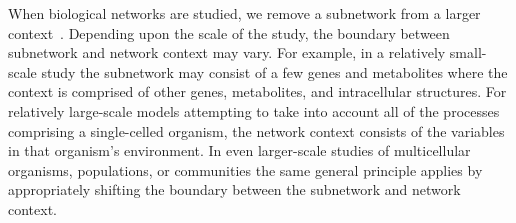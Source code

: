 
When biological networks are studied, we remove a subnetwork from a larger context~\cite{Alon2007}. Depending upon the scale of the study, the boundary between subnetwork and network context may vary. For example, in a relatively small-scale study the subnetwork may consist of a few genes and metabolites where the context is comprised of other genes, metabolites, and intracellular structures. For relatively large-scale models attempting to take into account all of the processes comprising a single-celled organism, the network context consists of the variables in that organism's environment. In even larger-scale studies of multicellular organisms, populations, or communities the same general principle applies by appropriately shifting the boundary between the subnetwork and network context.

